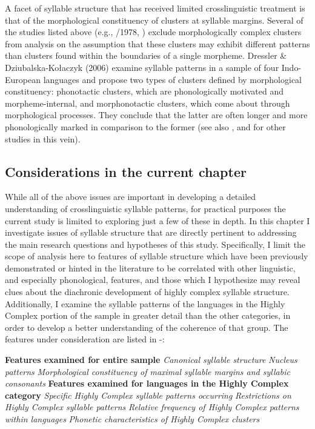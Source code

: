   A facet of syllable structure that has received limited crosslinguistic treatment is that of the morphological constituency of clusters at syllable margins. Several of the studies listed above (e.g., \citealt{Greenberg1965}/1978, \citealt{Morelli1999,Kreitman2008}) exclude morphologically complex clusters from analysis on the assumption that these clusters may exhibit different patterns than clusters found within the boundaries of a single morpheme. Dressler \& Dziubalska-Kołaczyk (2006) examine syllable patterns in a sample of four Indo-European languages and propose two types of clusters defined by morphological constituency: phonotactic clusters, which are phonologically motivated and morpheme-internal, and morphonotactic clusters, which come about through morphological processes. They conclude that the latter are often longer and more phonologically marked in comparison to the former (see also \citealt{DresslerEtAl2010,Orzechowska2012}, and \citealt{DresslerEtAl2015} for other studies in this vein).

\subsection{Considerations in the current chapter}\label{sec:3.1.2}

  While all of the above issues are important in developing a detailed understanding of crosslinguistic syllable patterns, for practical purposes the current study is limited to exploring just a few of these in depth. In this chapter I investigate issues of syllable structure that are directly pertinent to addressing the main research questions and hypotheses of this study. Specifically, I limit the scope of analysis here to features of syllable structure which have been previously demonstrated or hinted in the literature to be correlated with other linguistic, and especially phonological, features, and those which I hypothesize may reveal clues about the diachronic development of highly complex syllable structure. Additionally, I examine the syllable patterns of the languages in the Highly Complex portion of the sample in greater detail than the other categories, in order to develop a better understanding of the coherence of that group. The features under consideration are listed in -:

\ea\label{ex:3.1}
   \textbf{Features examined for entire sample}
\ea   \textit{Canonical syllable structure}
\ex   \textit{Nucleus patterns}
\ex   \textit{Morphological constituency of maximal syllable margins and syllabic consonants}
\z
\z
\ea\label{ex:3.2}
   \textbf{Features examined for languages in the Highly Complex category}
\ea   \textit{Specific Highly Complex syllable patterns occurring}
\ex   \textit{Restrictions on Highly Complex syllable patterns}
\ex   \textit{Relative frequency of Highly Complex patterns within languages}
\ex   \textit{Phonetic characteristics of Highly Complex clusters}
\z
\z

